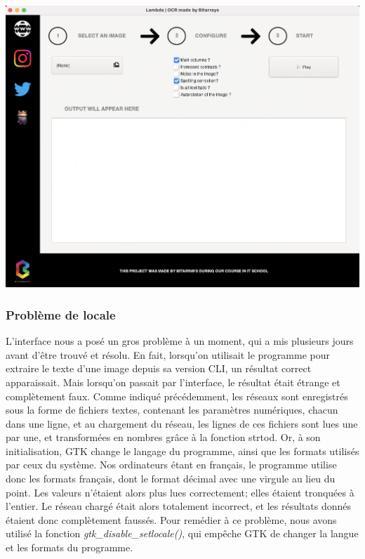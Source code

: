 \documentclass{article}
\begin{document}
\begin{center}
	\includegraphics[scale=0.25]{glade-light-theme}
\end{center}


\subsubsection{Problème de locale}
L’interface nous a posé un gros problème à un moment, qui a mis plusieurs jours avant d’être trouvé et résolu. En fait, lorsqu’on utilisait le programme pour extraire le texte d’une image depuis sa version CLI, un résultat correct apparaissait. Mais lorsqu’on passait par l’interface, le résultat était étrange et complètement faux.
Comme indiqué précédemment, les réseaux sont enregistrés sous la forme de fichiers textes, contenant les paramètres numériques, chacun dans une ligne, et au chargement du réseau, les lignes de ces fichiers sont lues une par une, et transformées en nombres grâce à la fonction strtod.
Or, à son initialisation, GTK change le langage du programme, ainsi que les formats utilisés par ceux du système. Nos ordinateurs étant en français, le programme utilise donc les formats français, dont le format décimal avec une virgule au lieu du point. Les valeurs n’étaient alors plus lues correctement; elles étaient tronquées à l’entier. Le réseau chargé était alors totalement incorrect, et les résultats donnés étaient donc complètement faussés.
Pour remédier à ce problème, nous avons utilisé la fonction \textit{gtk\_disable\_setlocale()}, qui empêche GTK de changer la langue et les formats du programme.
\end{document}
